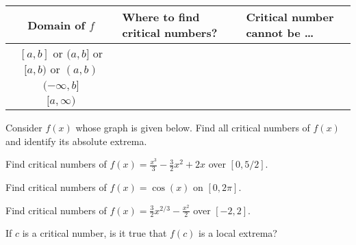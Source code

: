 \documentclass[../main.tex]{subfiles}
\begin{document}
\begin{center}
  \begin{tabular}{c|l|l}
    Domain of \(f\) & Where to find critical numbers? & Critical number cannot be \ldots{} \\\midrule
    \([a,b]\) or \((a,b]\) or \([a,b)\) or \((a,b)\) & & \\[1ex]\midrule
    \((-\infty, b]\) & & \\[1ex]\midrule
    \([a, \infty)\) & & \\[1ex]\midrule
  \end{tabular}
\end{center}

\begin{example} \label{ex:critical-numbers}
  Consider \(f(x)\) whose graph is given below. Find all critical numbers of \(f(x)\) and identify its absolute extrema.

  \begin{center}
    
  \end{center}
\end{example}
\clearpage

\begin{example} \label{ex:critical-number-polynomial}
  Find critical numbers of \(f(x) = \frac{x^{3}}{3} - \frac{3}{2}x^{2} + 2x\) over \([0, 5/2]\).
\end{example}

\begin{example} \label{ex:critical-number-trig}
  Find critical numbers of \(f(x) = \cos(x)\) on \([0, 2\pi]\).

\end{example}

\begin{example} \label{ex:critical-number-rational}
  Find critical numbers of \(f(x) = \frac{3}{2} x^{2/3} - \frac{x^{2}}{2}\) over \([-2,2]\). 

\end{example}
\clearpage

\begin{example} \label{ex:critical-number-is-candidate}
  If \(c\) is a critical number, is it true that \(f(c)\) is a local extrema?

  \begin{center}
    
    \hfill
    
    \hfill
    
    \hfill
    
  \end{center}
\end{example}
\end{document}
